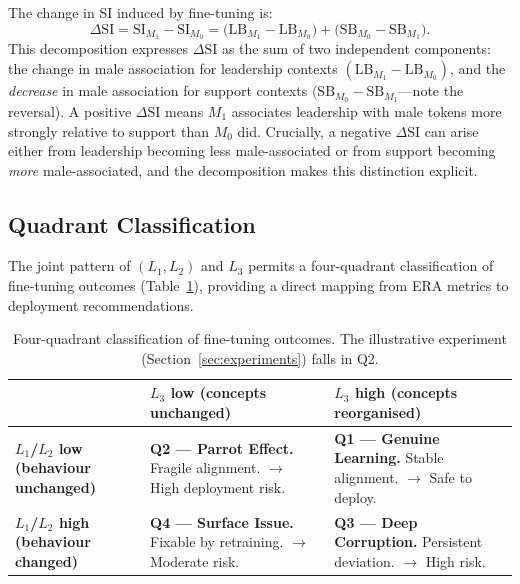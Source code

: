 \documentclass[11pt,a4paper]{article}
\newcommand{\M}[1]{M_{#1}}           %
\newcommand{\DeltaSI}{\Delta\mathrm{SI}}
\begin{document}
The change in SI induced by fine-tuning is:
\[
  \DeltaSI = \mathrm{SI}_{\M{1}} - \mathrm{SI}_{\M{0}}
  = \bigl(\mathrm{LB}_{\M{1}} - \mathrm{LB}_{\M{0}}\bigr)
  + \bigl(\mathrm{SB}_{\M{0}} - \mathrm{SB}_{\M{1}}\bigr).
\]
This decomposition expresses $\DeltaSI$ as the sum of two independent components: the
change in male association for leadership contexts
$(\mathrm{LB}_{\M{1}} - \mathrm{LB}_{\M{0}})$, and the \emph{decrease} in male
association for support contexts $(\mathrm{SB}_{\M{0}} - \mathrm{SB}_{\M{1}}$---note
the reversal). A positive $\DeltaSI$ means $\M{1}$ associates leadership with male
tokens more strongly relative to support than $\M{0}$ did. Crucially, a negative
$\DeltaSI$ can arise either from leadership becoming less male-associated or from support
becoming \emph{more} male-associated, and the decomposition makes this distinction
explicit.

\subsection{Quadrant Classification}

The joint pattern of $(L_1, L_2)$ and $L_3$ permits a four-quadrant classification of
fine-tuning outcomes (Table~\ref{tab:quadrants}), providing a direct mapping from ERA
metrics to deployment recommendations.

\begin{table}[ht]
\centering
\caption{Four-quadrant classification of fine-tuning outcomes. The illustrative
experiment (Section~\ref{sec:experiments}) falls in Q2.}
\label{tab:quadrants}
\setlength{\tabcolsep}{6pt}
\renewcommand{\arraystretch}{1.3}
\begin{tabularx}{\textwidth}{|>{\bfseries}X|X|X|}
\hline
 & \textbf{$L_3$ low (concepts unchanged)} & \textbf{$L_3$ high (concepts reorganised)} \\
\hline
$L_1$/$L_2$ low (behaviour unchanged) &
  \textbf{Q2 --- Parrot Effect.} Fragile alignment. $\to$ High deployment risk. &
  \textbf{Q1 --- Genuine Learning.} Stable alignment. $\to$ Safe to deploy. \\
\hline
$L_1$/$L_2$ high (behaviour changed) &
  \textbf{Q4 --- Surface Issue.} Fixable by retraining. $\to$ Moderate risk. &
  \textbf{Q3 --- Deep Corruption.} Persistent deviation. $\to$ High risk. \\
\hline
\end{tabularx}
\end{table}
\end{document}
